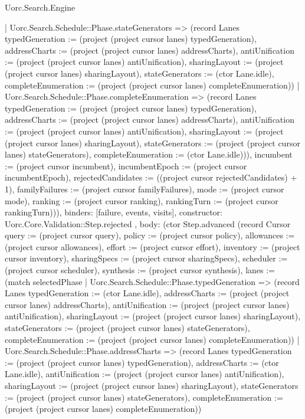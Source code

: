 \begin{lexlean}{Uorc.Search.Engine}
\begin{semanticmodule}
{{{{            | Uorc.Search.Schedule::Phase.stateGenerators => (record Lanes {typedGeneration := (project (project cursor lanes) typedGeneration), addressCharts := (project (project cursor lanes) addressCharts), antiUnification := (project (project cursor lanes) antiUnification), sharingLayout := (project (project cursor lanes) sharingLayout), stateGenerators := (ctor Lane.idle), completeEnumeration := (project (project cursor lanes) completeEnumeration)})
            | Uorc.Search.Schedule::Phase.completeEnumeration => (record Lanes {typedGeneration := (project (project cursor lanes) typedGeneration), addressCharts := (project (project cursor lanes) addressCharts), antiUnification := (project (project cursor lanes) antiUnification), sharingLayout := (project (project cursor lanes) sharingLayout), stateGenerators := (project (project cursor lanes) stateGenerators), completeEnumeration := (ctor Lane.idle)})), incumbent := (project cursor incumbent), incumbentEpoch := (project cursor incumbentEpoch), rejectedCandidates := ((project cursor rejectedCandidates) + 1), familyFailures := (project cursor familyFailures), mode := (project cursor mode), ranking := (project cursor ranking), rankingTurn := (project cursor rankingTurn)})),
          binders: [failure, events, visits],
          constructor: Uorc.Core.Validation::Step.rejected
        },
        {
          body: (ctor Step.advanced (record Cursor {query := (project cursor query), policy := (project cursor policy), allowances := (project cursor allowances), effort := (project cursor effort), inventory := (project cursor inventory), sharingSpecs := (project cursor sharingSpecs), scheduler := (project cursor scheduler), synthesis := (project cursor synthesis), lanes := (match selectedPhase
            | Uorc.Search.Schedule::Phase.typedGeneration => (record Lanes {typedGeneration := (ctor Lane.idle), addressCharts := (project (project cursor lanes) addressCharts), antiUnification := (project (project cursor lanes) antiUnification), sharingLayout := (project (project cursor lanes) sharingLayout), stateGenerators := (project (project cursor lanes) stateGenerators), completeEnumeration := (project (project cursor lanes) completeEnumeration)})
            | Uorc.Search.Schedule::Phase.addressCharts => (record Lanes {typedGeneration := (project (project cursor lanes) typedGeneration), addressCharts := (ctor Lane.idle), antiUnification := (project (project cursor lanes) antiUnification), sharingLayout := (project (project cursor lanes) sharingLayout), stateGenerators := (project (project cursor lanes) stateGenerators), completeEnumeration := (project (project cursor lanes) completeEnumeration)})
}}}}
\end{semanticmodule}
\end{lexlean}
